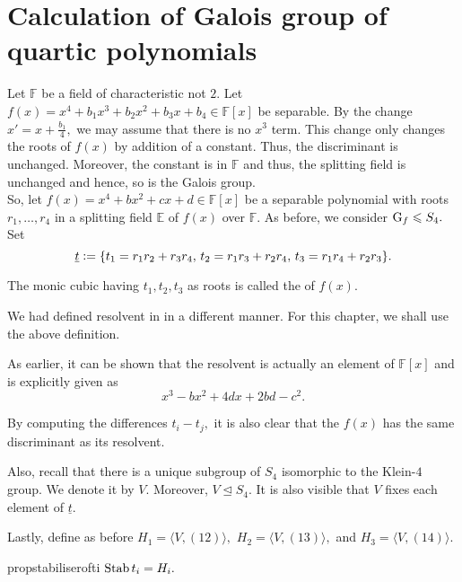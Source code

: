 \section{Calculation of Galois group of quartic polynomials}

Let $\mathbb{F}$ be a field of characteristic not $2.$ Let $f(x) = x^4 + b_1x^3 + b_2x^2 + b_3x + b_4 \in \mathbb{F}[x]$ be separable. By the change $x' = x + \frac{b_1}{4},$ we may assume that there is no $x^3$ term. This change only changes the roots of $f(x)$ by addition of a constant. Thus, the discriminant is unchanged. Moreover, the constant is in $\mathbb{F}$ and thus, the splitting field is unchanged and hence, so is the Galois group. \\
So, let $f(x) = x^4 + bx^2 + cx + d \in \mathbb{F}[x]$ be a separable polynomial with roots $r_1, \ldots, r_4$ in a splitting field $\mathbb{E}$ of $f(x)$ over $\mathbb{F}.$ As before, we consider $\operatorname{G}_f \leqslant S_4.$ Set
\begin{equation*} 
	\underline{t} \vcentcolon= \{t_1 = r_1r_2 + r_3r_4,\, t_2 = r_1r_3 + r_2r_4,\, t_3 = r_1r_4 + r_2r_3\}.
\end{equation*}

\begin{defn}
	The monic cubic having $t_1, t_2, t_3$ as roots is called the  of $f(x).$
\end{defn}
\begin{rem}
	We had defined resolvent in  in a different manner. For this chapter, we shall use the above definition. 

	As earlier, it can be shown that the resolvent is actually an element of $\mathbb{F}[x]$ and is explicitly given as
	\begin{equation*} 
		x^3 - bx^2 + 4dx + 2bd - c^2.
	\end{equation*}

	By computing the differences $t_i - t_j,$ it is also clear that the $f(x)$ has the same discriminant as its resolvent.
\end{rem}

Also, recall that there is a unique subgroup of $S_4$ isomorphic to the Klein-$4$ group. We denote it by $V.$ Moreover, $V \unlhd S_4.$ It is also visible that $V$ fixes each element of $\underline{t}.$

Lastly, define as before $H_1 = \langle V, (12)\rangle,$ $H_2 = \langle V, (13)\rangle,$ and $H_3 = \langle V, (14)\rangle.$

\begin{restatable}[]{prop}{stabiliserofti}
\label{prop:stabiliserofti}
	$\operatorname{Stab} t_i = H_i.$ \hfill\hyperref[prop:stabiliserofti2]{\downsym}
\end{restatable}

